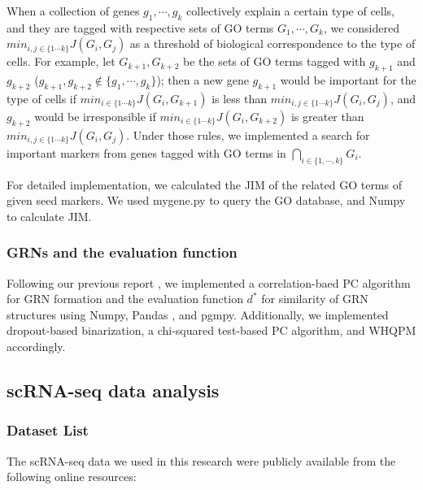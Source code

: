 \documentclass{article}
\begin{document}
When a collection of genes $g_1, \cdots, g_k$ collectively explain a certain type of cells, and they are tagged with respective 
sets of GO terms $G_1, \cdots, G_k$, we considered $min_{i,j\in\{1\cdots k\}}J(G_i, G_j)$ as a threshold of biological correspondence 
to the type of cells. For example, let $G_{k+1}, G_{k+2}$ be the sets of GO terms tagged with $g_{k+1}$ and $g_{k+2}$ 
($g_{k+1}, g_{k+2}\notin \{g_1, \cdots, g_k\}$); then a new gene $g_{k+1}$ would be important for the type of cells if $min_{i\in\{1\cdots k\}}J(G_i, G_{k+1})$ 
is less than $min_{i,j\in\{1\cdots k\}}J(G_i, G_j)$, and $g_{k+2}$ would be irresponsible if $min_{i\in\{1\cdots k\}}J(G_i, G_{k+2})$ is greater than 
$min_{i,j\in\{1\cdots k\}}J(G_i, G_j)$. Under those rules, we implemented a search for important markers from genes tagged with 
GO terms in $\bigcap_{i\in\{1,\cdots,k\}}G_i$.

For detailed implementation, we calculated the JIM of the related GO terms of given seed markers. We used 
mygene.py \cite{mygene} to query the GO database, and Numpy \cite{numpy} to calculate JIM.

\subsubsection*{GRNs and the evaluation function}
Following our previous report \cite{okano2023set}, we implemented a correlation-baed PC algorithm for GRN formation and the evaluation 
function $d^*$ for similarity of GRN structures using Numpy, Pandas \cite{pandas}, and pgmpy. Additionally, we 
implemented dropout-based binarization, a chi-squared test-based PC algorithm, and WHQPM accordingly.


\subsection*{scRNA-seq data analysis}
\subsubsection*{Dataset List}
The scRNA-seq data we used in this research were publicly available from the following online resources:
\end{document}
